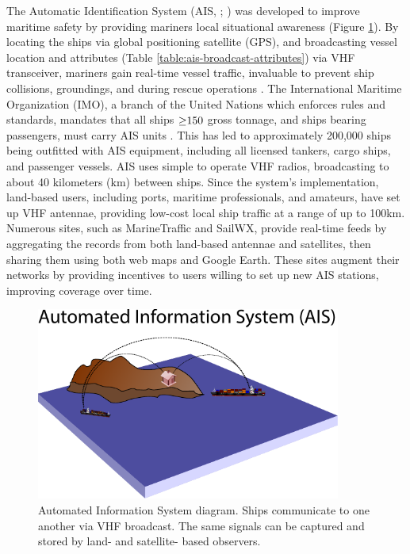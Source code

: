 The Automatic Identification System (AIS, ; \citealp{Tetreault2002}) was developed to improve maritime safety by providing mariners local situational awareness (Figure \ref{fig:ais-overview}). By locating the ships via global positioning satellite (GPS), and broadcasting vessel location and attributes (Table \ref{table:ais-broadcast-attributes}) via VHF transceiver, mariners gain real-time vessel traffic, invaluable to prevent ship collisions, groundings, and during rescue operations \citep{Itu-r2010}.  The International Maritime Organization (IMO), a branch of the United Nations which enforces rules and standards, mandates that all ships $\geq\negthickspace 150$ gross tonnage, and ships bearing passengers, must carry AIS units \citep{solas}. This has led to approximately 200,000 ships being outfitted with AIS equipment, including all licensed tankers, cargo ships, and passenger vessels. AIS uses simple to operate VHF radios, broadcasting to about 40 kilometers (km) between ships. Since the system's implementation, land-based users, including ports, maritime professionals, and amateurs, have set up VHF antennae, providing low-cost local ship traffic at a range of up to 100km. Numerous sites, such as MarineTraffic \citep{MarineTraffic} and SailWX, provide real-time feeds by aggregating the records from both land-based antennae and satellites, then sharing them using both web maps and Google Earth. These sites augment their networks by providing incentives to users willing to set up new AIS stations, improving coverage over time.

\begin{figure}[htbp]
  \centering
  \includegraphics[width=100mm]{figures/towers/drawing-myriad.pdf}
  \caption[Automated Information System diagram]{Automated Information System diagram. Ships communicate to one another via VHF broadcast. The same signals can be captured and stored by land- and satellite- based observers.}
  \label{fig:ais-overview}
\end{figure}

